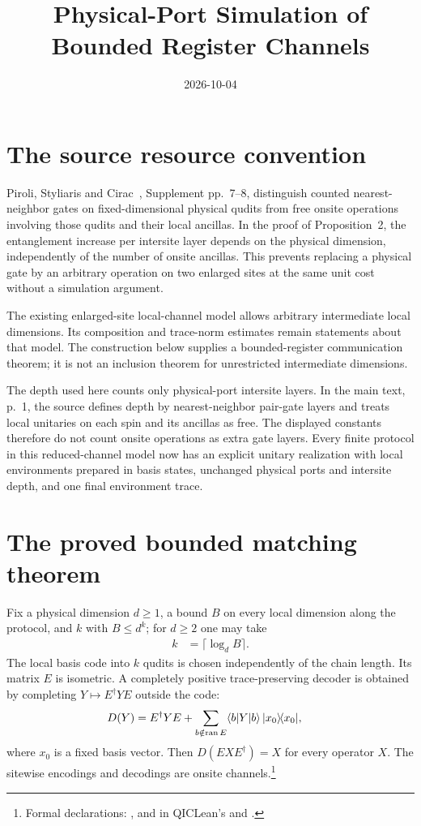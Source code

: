 \documentclass{article}
\title{Physical-Port Simulation of Bounded Register Channels}
\author{}
\date{2026-10-04}
\begin{document}
\maketitle
{}

\section{The source resource convention}
Piroli, Styliaris and Cirac~\cite{Piroli2021LOCC}, Supplement pp.~7--8,
distinguish counted nearest-neighbor gates on fixed-dimensional physical
qudits from free onsite operations involving those qudits and their local
ancillas. In the proof of Proposition~2, the entanglement increase per
intersite layer depends on the physical dimension, independently of the
number of onsite ancillas. This prevents replacing a physical gate by an
arbitrary operation on two enlarged sites at the same unit cost without a
simulation argument.

The existing enlarged-site local-channel model allows arbitrary
intermediate local dimensions. Its composition and trace-norm estimates
remain statements about that model. The construction below supplies a
bounded-register communication theorem; it is not an inclusion theorem
for unrestricted intermediate dimensions.

The depth used here counts only physical-port intersite layers. In the
main text, p.~1, the source defines depth by nearest-neighbor pair-gate
layers and treats local unitaries on each spin and its ancillas as free.
The displayed constants therefore do not count onsite operations as extra
gate layers. Every finite protocol in this reduced-channel model now has
an explicit unitary realization with local environments prepared in basis
states, unchanged physical ports and intersite depth, and one final
environment trace.

\section{The proved bounded matching theorem}
Fix a physical dimension $d\ge1$, a bound $B$ on every local dimension along
the protocol, and $k$ with $B\le d^k$; for $d\ge2$ one may take
\begin{align}
    k & =\lceil\log_d B\rceil.
\end{align}
The local basis code into $k$ qudits is chosen independently of the chain
length. Its matrix $E$ is isometric. A completely positive trace-preserving
decoder is obtained by completing $Y\mapsto E^\dagger YE$ outside the code:
\begin{align}
    D(Y) & =E^\dagger YE+
    \sum_{b\notin\operatorname{ran}E}\langle b|Y|b\rangle\,|x_0\rangle\!\langle x_0|,
\end{align}
where $x_0$ is a fixed basis vector. Then $D(EXE^\dagger)=X$ for every
operator $X$. The sitewise encodings and decodings are onsite
channels.\footnote{Formal declarations:
    ,  and
     in QICLean's
     and
    .}
\end{document}
